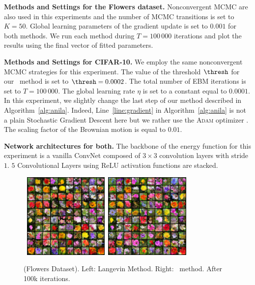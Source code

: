 \documentclass[letterpaper]{article} %
\begin{document}
\medskip
\textbf{Methods and Settings for the Flowers dataset.}
Nonconvergent MCMC are also used in this experiments and the number of MCMC transitions is set to $K = 50$.
Global learning parameters of the gradient update is set to $0.001$ for both methods.
We run each method during $T = 100\,000$ iterations and plot the results using the final vector of fitted parameters.

\textbf{Methods and Settings for CIFAR-10.}
We employ the same nonconvergent MCMC strategies for this experiment.
The value of the threshold $\thresh$ for our \algo\ method is set to $\thresh = 0.0002$.
The total number of EBM iterations is set to $T = 100\,000$.
The global learning rate $\eta$ is set to a constant equal to $0.0001$.
In this experiment, we slightly change the last step of our method described in Algorithm~\ref{alg:anila}.
Indeed, Line~\ref{line:gradient} in Algorithm~\ref{alg:anila} is not a plain Stochastic Gradient Descent here but we rather use the \textsc{Adam} optimizer \cite{KB15}.
The scaling factor of the Brownian motion is equal to $0.01$.



\medskip
\textbf{Network architectures for both.} 
The backbone of the energy function for this experiment is a vanilla ConvNet composed of $3 \times 3$ convolution layers with stride $1$.
$5$ Convolutional Layers using ReLU activation functions are stacked.



\begin{figure}[t]
\begin{center}
        \mbox{
        \includegraphics[width=1.65in]{figs/flowerslangevin}
        \includegraphics[width=1.65in]{figs/flowersanila}
        }
\end{center}
	\caption{(Flowers Dataset). Left: Langevin Method. Right: \algo\ method. After 100k iterations.}
	\label{fig:flowers}
\end{figure}
\end{document}
